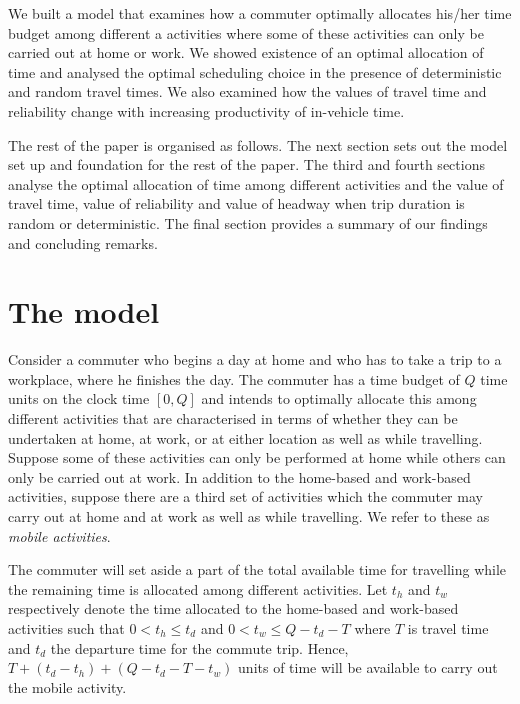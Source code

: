 \documentclass[12pt,a4paper,british]{article}
\theoremstyle{definition}
\theoremstyle{plain}
\theoremstyle{plain}
\theoremstyle{plain}
\begin{document}
We built a model that examines how a commuter optimally allocates his/her time budget among different a activities where some of these activities can only be carried out at home or work. We showed existence of an optimal allocation of time and analysed the optimal scheduling choice in the presence of deterministic and random travel times. We also examined how the values of travel time and reliability change with increasing productivity of in-vehicle time.

The rest of the paper is organised as follows. The next section sets out the model set up and foundation for the rest of the paper. The third and fourth sections analyse the optimal allocation of time among different activities and the value of travel time, value of reliability and value of headway when trip duration is random or deterministic. The final section provides a summary of our findings and concluding remarks.

\section{The model}
\label{sec:model}

Consider a commuter who begins a day at home and who has to take a trip to a workplace, where he finishes the day. The commuter has a time budget of $Q$ time units on the clock time $[0, Q]$ and intends to optimally allocate this among different activities that are characterised in terms of whether they can be undertaken at home, at work, or at either location as well as while travelling. Suppose some of these activities can only be performed at home while others can only be carried out at work. In addition to the home-based and work-based activities, suppose there are a third set of activities which the commuter may carry out at home and at work as well as while travelling. We refer to these as \textit{mobile activities}. 

The commuter will set aside a part of the total available time for travelling while the remaining time is allocated among different activities. Let $t_{h}$ and $t_{w}$ respectively denote the time allocated to the home-based and work-based activities such that $0<t_{h}\leq t_{d}$ and $0<t_{w}\leq Q-t_{d}-T$ where $T$ is travel time and $t_d$ the departure time for the commute trip. Hence, $T+\left(t_{d}-t_{h}\right)+\left(Q-t_{d}-T-t_{w}\right)$ units of time will be available to carry out the mobile activity. 
\end{document}
